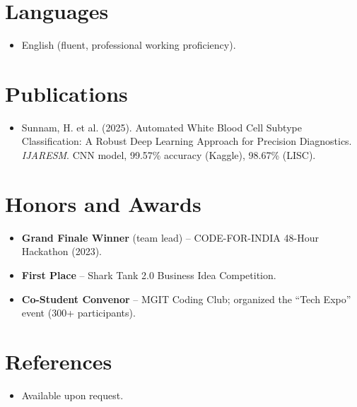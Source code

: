\documentclass[11pt,a4paper,sans]{moderncv}
\begin{document}

\section{Languages}
\vspace{1pt}
\begin{itemize}
\item {English (fluent, professional working proficiency).}
\end{itemize}


\section{Publications}
\vspace{1pt}
\begin{itemize}
\item {Sunnam, H. et al. (2025). Automated White Blood Cell Subtype Classification: A Robust Deep Learning Approach for Precision Diagnostics. \textit{IJARESM}. CNN model, 99.57\% accuracy (Kaggle), 98.67\% (LISC).}
\end{itemize}


\section{Honors and Awards}
\vspace{1pt}
\begin{itemize}
\item{\textbf{Grand Finale Winner} (team lead) -- CODE-FOR-INDIA 48-Hour Hackathon (2023).}
\item{\textbf{First Place} -- Shark Tank 2.0 Business Idea Competition.}
\item{\textbf{Co-Student Convenor} -- MGIT Coding Club; organized the ``Tech Expo'' event (300+ participants).}
\end{itemize}


\section{References}
\vspace{1pt}
\begin{itemize}
\item{Available upon request.}
\end{itemize}
\end{document}

